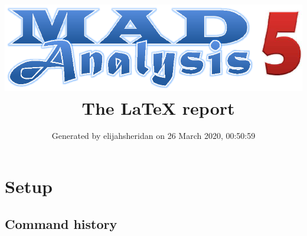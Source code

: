 \documentclass[a4paper, 10pt]{article}
\title{{\includegraphics[scale=.4]{logo.eps}}\ The LaTeX report}
\author{Generated by elijahsheridan on 26 March 2020, 00:50:59}
\begin{document}
\maketitle
\flushbottom

\newpage
\section{ Setup}

\subsection{ Command history}
\end{document}
